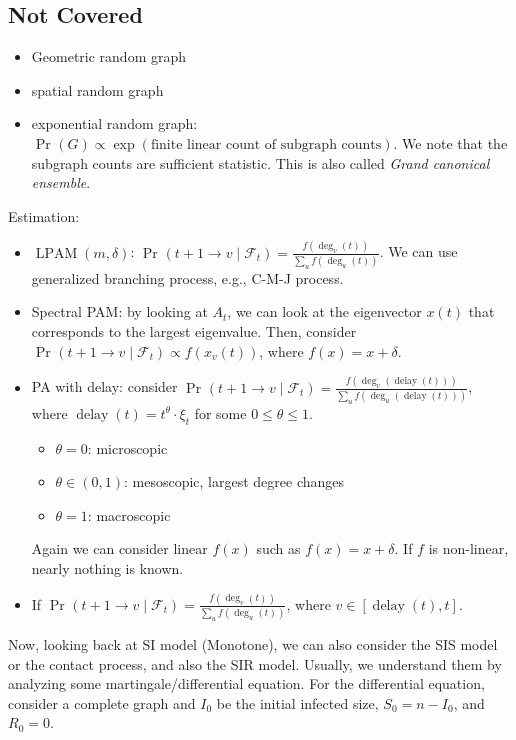 \subsection{Not Covered}
\begin{itemize}
	\item Geometric random graph
	\item spatial random graph
	\item exponential random graph: \(\Pr_{}\left(G\right) \propto \exp (\text{finite linear count of subgraph counts} )\). We note that the subgraph counts are sufficient statistic. This is also called \emph{Grand canonical ensemble}.
\end{itemize}

Estimation:
\begin{itemize}
	\item \(\operatorname{LPAM}(m, \delta ) \): \(\Pr_{}\left(t+1 \to v \mid \mathcal{F} _t \right) = \frac{f(\deg _v(t))}{\sum_{u} f(\deg _u(t))}\). We can use generalized branching process, e.g., C-M-J process.
	\item Spectral PAM: by looking at \(A_t\), we can look at the eigenvector \(x(t)\) that corresponds to the largest eigenvalue. Then, consider \(\Pr_{}\left(t+1 \to v \mid \mathcal{F} _t \right) \propto f(x_v(t))\), where \(f(x) = x + \delta \).
	\item PA with delay: consider \(\Pr_{}\left(t+1 \to v \mid \mathcal{F} _t \right) = \frac{f(\deg _v(\operatorname{delay}(t) ))}{\sum_{u} f(\deg _u(\operatorname{delay}(t) ))}\), where \(\operatorname{delay}(t) = t^\theta \cdot \xi _t\) for some \(0 \leq \theta \leq 1\).
	      \begin{itemize}
		      \item \(\theta = 0\): microscopic
		      \item \(\theta \in (0, 1)\): mesoscopic, largest degree changes
		      \item \(\theta = 1\): macroscopic
	      \end{itemize}
	      Again we can consider linear \(f(x)\) such as \(f(x) = x + \delta \). If \(f\) is non-linear, nearly nothing is known.
	\item If \(\Pr_{}\left(t + 1 \to v \mid \mathcal{F} _t \right) = \frac{f(\deg _v(t))}{\sum_{u} f(\deg _u(t))}\), where \(v \in [\operatorname{delay}(t) , t]\).
\end{itemize}

Now, looking back at SI model (Monotone), we can also consider the SIS model or the contact process, and also the SIR model. Usually, we understand them by analyzing some martingale/differential equation. For the differential equation, consider a complete graph and \(I_0\) be the initial infected size, \(S_0 = n - I_0\), and \(R_0 =0\).

